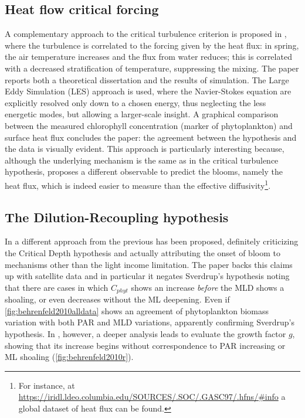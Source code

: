 \subsection{Heat flow critical forcing}
A complementary approach to the critical turbulence criterion is proposed in \autocite{Taylor2011ShutdownBlooms}, where the turbulence is correlated to the forcing given by the heat flux: in spring, the air temperature increases and the flux from water reduces; this is correlated with a decreased stratification of temperature, suppressing the mixing. The paper reports both a theoretical dissertation and the results of simulation. The Large Eddy Simulation (LES) approach is used, where the Navier-Stokes equation are explicitly resolved only down to a chosen energy, thus neglecting the less energetic modes, but allowing a larger-scale insight. A graphical comparison between the measured chlorophyll concentration (marker of phytoplankton) and surface heat flux concludes the paper: the agreement between the hypothesis and the data is visually evident.
This approach is particularly interesting because, although the underlying mechanism is the same as in the critical turbulence hypothesis, proposes a different observable to predict the blooms, namely the heat flux, which is indeed easier to measure than the effective diffusivity\footnote{For instance, at \url{https://iridl.ldeo.columbia.edu/SOURCES/.SOC/.GASC97/.hfns/\#info} 
a global dataset of heat flux can be found.}. 

\subsection{The Dilution-Recoupling hypothesis} \label{sec:behrenfeld}
In \autocite{Behrenfeld2010AbandoningBlooms} a different approach from the previous has been proposed, definitely criticizing the Critical Depth hypothesis and actually attributing the onset of bloom to mechanisms other than the light income limitation. The paper backs this claims up with satellite data and in particular it negates Sverdrup's hypothesis noting that there are cases in which $C_{phyt}$ shows an increase \textit{before} the MLD shows a shoaling, or even decreases without the ML deepening. Even if \autoref{fig:behrenfeld2010alldata} shows an agreement of phytoplankton biomass variation with both PAR and MLD variations, apparently confirming Sverdrup's hypothesis. In \autocite{Behrenfeld2010AbandoningBlooms}, however, a deeper analysis leads to evaluate the growth factor $g$, showing that its increase begins without correspondence to PAR increasing or ML shoaling (\autoref{fig:behrenfeld2010r}).

